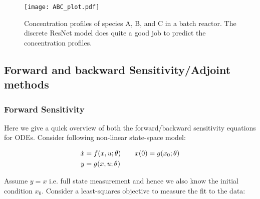 \documentclass[fontsize=11pt]{article}
\theoremstyle{definition}
\begin{document}
\begin{figure}
    \centering
    \texttt{[image: ABC\_plot.pdf]} 
    \caption{Concentration profiles of species A, B, and C in a batch reactor. The 
    discrete ResNet model does quite a good job to predict the concentration profiles.}
    \label{fig:resnet}
\end{figure}

\subsection{Forward and backward Sensitivity/Adjoint methods}

\subsubsection{Forward Sensitivity}
\label{sec:sens}

Here we give a quick overview of both the forward/backward sensitivity equations for ODEs. Consider following
non-linear state-space model:

\begin{align}
    \dot{x} &= f(x, u; \theta) \qquad x(0) = g(x_0; \theta)\notag \\
    y &= g(x, u; \theta)
    \label{eq:ssode}
\end{align}

Assume $y=x$ i.e. full state measurement and hence we also know the initial condition
$x_0$. Consider a least-squares objective to measure the fit to the data:
\end{document}
